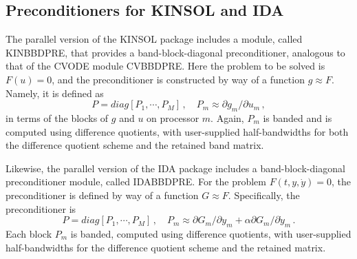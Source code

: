 \subsection{Preconditioners for KINSOL and IDA}

The parallel version of the KINSOL package includes a module, called
KINBBDPRE, that provides a band-block-diagonal preconditioner,
analogous to that of the CVODE module CVBBDPRE.  Here the problem to
be solved is $F(u) = 0$, and the preconditioner is constructed by way
of a function $g \approx F$.  Namely, it is defined as
\begin{equation*}
  P = diag[P_1,\cdots,P_M] \, , \quad
  P_m \approx \partial g_m / \partial u_m \, ,
\end{equation*}
in terms of the blocks of $g$ and $u$ on processor $m$.  Again, $P_m$
is banded and is computed using difference quotients, with user-supplied
half-bandwidths for both the difference quotient scheme and the
retained band matrix.

Likewise, the parallel version of the IDA package includes a
band-block-diagonal preconditioner module, called IDABBDPRE.  For the
problem $F(t,y,{\dot y}) = 0$, the preconditioner is defined by way of a
function $G \approx F$.  Specifically, the preconditioner is
\begin{equation*}
  P = diag[P_1,\cdots,P_M] \, ,
  \quad P_m \approx \partial G_m / \partial y_m
  + \alpha \partial G_m / \partial {\dot y}_m \, . 
\end{equation*}
Each block $P_m$ is banded, computed using difference quotients, with
user-supplied half-bandwidths for the difference quotient scheme and
the retained matrix.

